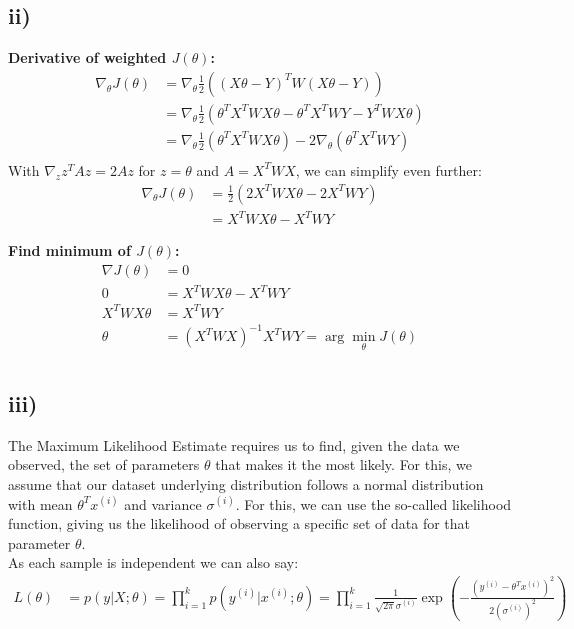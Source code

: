 \begin{answer}
    \subsection*{ii)}
    \textbf{Derivative of weighted $J(\theta)$:}
    \begin{align*}
        \nabla_\theta J(\theta) &=\nabla_\theta \frac{1}{2} ((X\theta - Y)^T W (X\theta - Y)) \\
        &= \nabla_\theta \frac{1}{2}(\theta^T X^T W X \theta - \theta^T X^T W Y - Y^T W X \theta) \\
        &= \nabla_\theta \frac{1}{2}(\theta^T X^T W X \theta) - 2 \nabla_\theta (\theta^T X^T W Y) \\
    \end{align*}
    With $\nabla_z z^T A z = 2Az$ for $z=\theta$ and $A=X^T W X$, we can simplify even further:
\begin{align*}
        \nabla_\theta J(\theta) &= \frac{1}{2} (2X^T W X \theta - 2X^T W Y) \\
        &= X^T W X \theta - X^T W Y
        \end{align*}
        
    \textbf{Find minimum of $J(\theta)$:}
    \begin{align*}
        \nabla J(\theta) &= 0 \\
        0 &= X^T W X \theta - X^T W Y \\
        X^T W X \theta &= X^T W Y \\
        \theta &= (X^T W X)^{-1} X^T W Y = \arg\min_\theta J(\theta) \\
    \end{align*}

    \subsection*{iii)}
    The Maximum Likelihood Estimate requires us to find, given the data we observed, 
the set of parameters \(\theta\) that makes it the most likely.
For this, we assume that our dataset underlying distribution follows a normal distribution
with mean \(\theta^T x^{(i)}\) and variance \(\sigma^{(i)}\).
For this, we can use the so-called likelihood function, giving us the likelihood
of observing a specific set of data for that parameter \(\theta\). \\

As each sample is independent we can also say:
\begin{align*}
    L(\theta) &= p(y|X; \theta) = \prod_{i=1}^{k} p(y^{(i)}|x^{(i)}; \theta) = \prod_{i=1}^{k} \frac{1}{\sqrt{2\pi}\sigma^{(i)}} \exp\left(-\frac{(y^{(i)} - \theta^T x^{(i)})^2}{2(\sigma^{(i)})^2}\right)
    \end{align*}
    

\end{answer}
